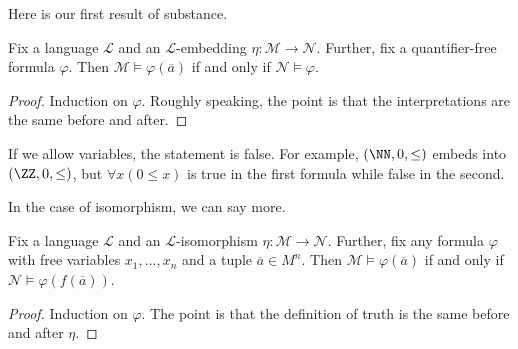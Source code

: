 \documentclass[../notes.tex]{subfiles}
\begin{document}
Here is our first result of substance.
\begin{proposition}
	Fix a language $\mathcal L$ and an $\mathcal L$-embedding $\eta\colon\mathcal M\to\mathcal N$. Further, fix a quantifier-free formula $\varphi$. Then $\mathcal M\models\varphi(\overline a)$ if and only if $\mathcal N\models\varphi$.
\end{proposition}
\begin{proof}
	Induction on $\varphi$. Roughly speaking, the point is that the interpretations are the same before and after.
\end{proof}
\begin{remark}
	If we allow variables, the statement is false. For example, $(\NN,0,\le)$ embeds into $(\ZZ,0,\le)$, but $\forall x(0\le x)$ is true in the first formula while false in the second.
\end{remark}
In the case of isomorphism, we can say more.
\begin{proposition} \label{prop:isos-have-same-theory}
	Fix a language $\mathcal L$ and an $\mathcal L$-isomorphism $\eta\colon\mathcal M\to\mathcal N$. Further, fix any formula $\varphi$ with free variables $x_1,\ldots,x_n$ and a tuple $\overline a\in M^n$. Then $\mathcal M\models\varphi(\overline a)$ if and only if $\mathcal N\models\varphi(f(\overline a))$.
\end{proposition}
\begin{proof}
	Induction on $\varphi$. The point is that the definition of truth is the same before and after $\eta$.
\end{proof}
\end{document}
